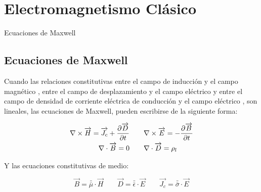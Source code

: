 
\chapter{Electromagnetismo Clásico} %

\label{AppendixElectromagnetismoClasico} %




Ecuaciones de Maxwell



\section{Ecuaciones de Maxwell}


Cuando las relaciones constitutivas entre el campo de inducción  y el campo magnético , entre el campo de desplazamiento  y el campo eléctrico  y entre el campo de densidad de corriente eléctrica de conducción  y el campo eléctrico , son lineales, las ecuaciones de Maxwell, pueden escribirse de la siguiente forma:

\begin{equation}
\label{eq:ap1}
\begin{aligned}
	\nabla \times \overrightarrow{H} = \overrightarrow{J_{c}} + \dfrac{\partial \overrightarrow{D}}{\partial t} 
	\quad \quad
	&\nabla \times \overrightarrow{E} = - \dfrac{\partial \overrightarrow{B}}{\partial t} 	\\
	\nabla \cdot \overrightarrow{B}=0
	\quad \quad
	&\nabla \cdot \overrightarrow{D} = \rho_{l} 
\end{aligned}
\end{equation}

Y las ecuaciones constitutivas de medio:

\begin{equation}
\label{eq:ap2}
	\overrightarrow{B}    = \bar{\bar{\mu}}      \cdot \overrightarrow{H} 
	\quad\quad
	\overrightarrow{D}    = \bar{\bar{\epsilon}} \cdot \overrightarrow{E} 
	\quad\quad
	\overrightarrow{J_{c}}= \bar{\bar{\sigma}}   \cdot \overrightarrow{E} 
\end{equation}


